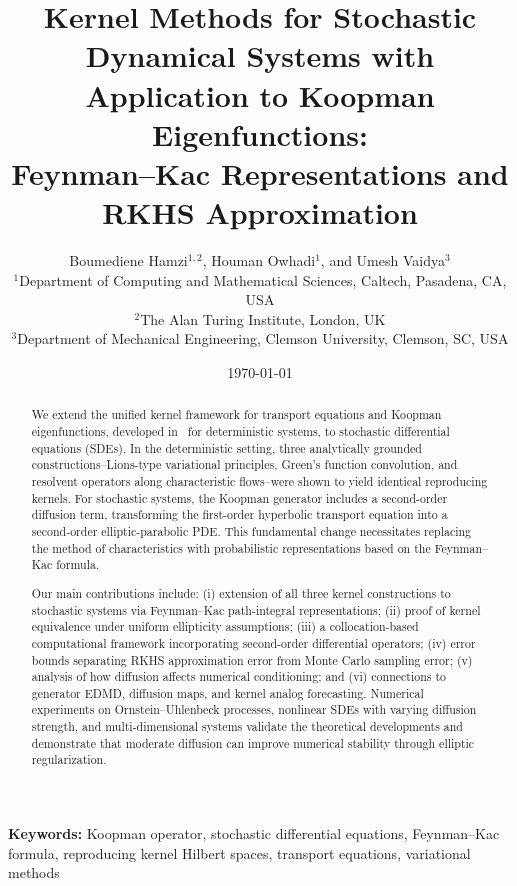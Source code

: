 \documentclass[11pt,a4paper]{article}
\title{\LARGE Kernel Methods for  Stochastic Dynamical Systems
with Application to Koopman Eigenfunctions:\\[0.5em]
\large Feynman--Kac Representations and RKHS Approximation}
\author{
Boumediene Hamzi$^{1,2}$, Houman Owhadi$^{1}$, and Umesh Vaidya$^{3}$\\[1em]
$^{1}$Department of Computing and Mathematical Sciences, Caltech, Pasadena, CA, USA\\
$^{2}$The Alan Turing Institute, London, UK\\
$^{3}$Department of Mechanical Engineering, Clemson University, Clemson, SC, USA
}
\date{\today}
\begin{document}

\maketitle

\begin{abstract}
We extend the unified kernel framework for transport equations and Koopman eigenfunctions, developed in~\cite{HamziOwhadiVaidya2024} for deterministic systems, to stochastic differential equations (SDEs). In the deterministic setting, three analytically grounded constructions--Lions-type variational principles, Green's function convolution, and resolvent operators along characteristic flows--were shown to yield identical reproducing kernels. For stochastic systems, the Koopman generator includes a second-order diffusion term, transforming the first-order hyperbolic transport equation into a second-order elliptic-parabolic PDE. This fundamental change necessitates replacing the method of characteristics with probabilistic representations based on the Feynman--Kac formula.

Our main contributions include: (i) extension of all three kernel constructions to stochastic systems via Feynman--Kac path-integral representations; (ii) proof of kernel equivalence under uniform ellipticity assumptions; (iii) a collocation-based computational framework incorporating second-order differential operators; (iv) error bounds separating RKHS approximation error from Monte Carlo sampling error; (v) analysis of how diffusion affects numerical conditioning; and (vi) connections to generator EDMD, diffusion maps, and kernel analog forecasting. Numerical experiments on Ornstein--Uhlenbeck processes, nonlinear SDEs with varying diffusion strength, and multi-dimensional systems validate the theoretical developments and demonstrate that moderate diffusion can improve numerical stability through elliptic regularization.
\end{abstract}

\textbf{Keywords:} Koopman operator, stochastic differential equations, Feynman--Kac formula, reproducing kernel Hilbert spaces, transport equations, variational methods

\tableofcontents
\newpage
\end{document}
